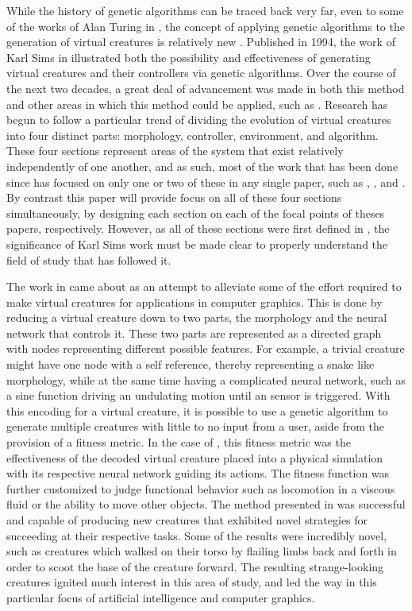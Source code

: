 \documentclass[12pt]{article}
\begin{document}
While the history of genetic algorithms can be traced back very far, even to some of the works of Alan Turing in \cite{turing1950computing}, the concept of applying genetic algorithms to the generation of virtual creatures is relatively new \cite{sims1994evolving}.
Published in 1994, the work of Karl Sims in \cite{sims1994evolving} illustrated both the possibility and effectiveness of generating virtual creatures and their controllers via genetic algorithms.
Over the course of the next two decades, a great deal of advancement was made in both this method and other areas in which this method could be applied, such as \cite{hornby2001evolution}.
Research has begun to follow a particular trend of dividing the evolution of virtual creatures into four distinct parts: morphology, controller, environment, and algorithm.
These four sections represent areas of the system that exist relatively independently of one another, and as such, most of the work that has been done since \cite{sims1994evolving} has focused on only one or two of these in any single paper, such as \cite{krcah2007evolutionary}, \cite{hornby2001evolving}, and \cite{lehman2011evolving}.
By contrast this paper will provide focus on all of these four sections simultaneously, by designing each section on each of the focal points of theses papers, respectively.
However, as all of these sections were first defined in \cite{sims1994evolving}, the significance of Karl Sims work must be made clear to properly understand the field of study that has followed it.

The work in \cite{sims1994evolving} came about as an attempt to alleviate some of the effort required to make virtual creatures for applications in computer graphics.
This is done by reducing a virtual creature down to two parts, the morphology and the neural network that controls it.
These two parts are represented as a directed graph with nodes representing different possible features.
For example, a trivial creature might have one node with a self reference, thereby representing a snake like morphology, while at the same time having a complicated neural network, such as  a sine function driving an undulating motion until an sensor is triggered.
With this encoding for a virtual creature, it is possible to use a genetic algorithm to generate multiple creatures with little to no input from a user, aside from the provision of a fitness metric.
In the case of \cite{sims1994evolving}, this fitness metric was the effectiveness of the decoded virtual creature placed into a physical simulation with its respective neural network guiding its actions.
The fitness function was further customized to judge functional behavior such as locomotion in a viscous fluid or the ability to move other objects.
The method presented in \cite{sims1994evolving} was successful and capable of producing new creatures that exhibited novel strategies for succeeding at their respective tasks.
Some of the results were incredibly novel, such as creatures which walked on their torso by flailing limbs back and forth in order to scoot the base of the creature forward.
The resulting strange-looking creatures ignited much interest in this area of study, and led the way in this particular focus of artificial intelligence and computer graphics.
\end{document}
